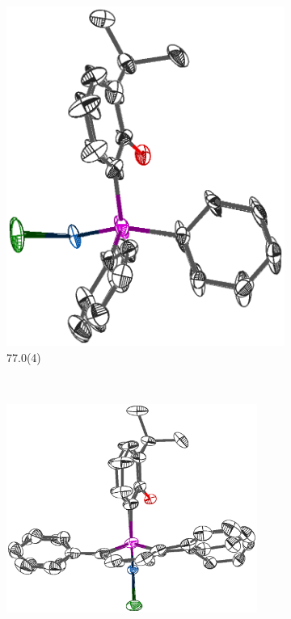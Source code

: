 \begin{figure}[htbp]
\begin{subfigure}[b]{0.3\textwidth}
                \includegraphics[width=\textwidth]{../Othercrystals/PtCl2/730506side.eps}
                \caption{77.0(4)\degrees}
                \label{PtCl2Cyside}
        \end{subfigure}%
        \\
        \begin{subfigure}[b]{0.4\textwidth}
                \includegraphics[width=0.9\textwidth]{../Othercrystals/PtCl2/687181side.eps}

\end{subfigure}
\end{figure}
